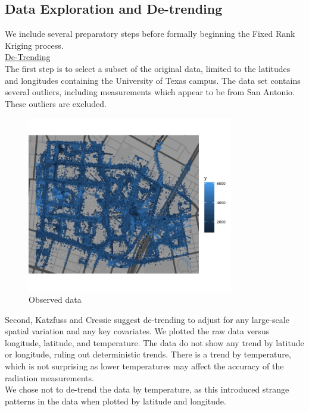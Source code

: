 \documentclass[11pt]{article}
\begin{document}
\subsection{Data Exploration and De-trending}
We include several preparatory steps before formally beginning the Fixed Rank Kriging process.\\

\underline{De-Trending}\\

The first step is to select a subset of the original data, limited to the latitudes and longitudes containing the University of Texas campus.  The data set contains several outliers, including measurements which appear to be from San Antonio.  These outliers are excluded. \\

\begin{figure}[!ht]
\centering
\includegraphics[width=90mm,keepaspectratio]{Images/original_data_plot.jpg}
\caption{Observed data \label{fig:1}}
\end{figure}

Second, Katzfuss and Cressie suggest de-trending to adjust for any large-scale spatial variation and any key covariates.  We plotted the raw data versus longitude, latitude, and temperature.  The data do not show any trend by latitude or longitude, ruling out deterministic trends.  There is a trend by temperature, which is not surprising as lower temperatures may affect the accuracy of the radiation measurements. \\

We chose not to de-trend the data by temperature, as this introduced strange patterns in the data when plotted by latitude and longitude. \\
\end{document}

